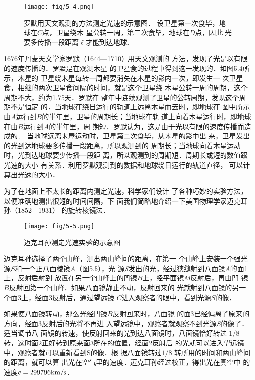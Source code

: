 \begin{figure}[htp]\centering
    \texttt{[image: fig/5-4.png]}
    \caption{罗默用天文观测的方法测定光速的示意图．
    设卫星第一次食毕，地球在$C$点，卫星绕木
    星公转一周，第二次食毕，地球在$D$点，因此
    光要多传播一段距离$\ell$才能到达地球．}
    \end{figure}

1676年丹麦天文学家罗默（1644—1710）用天文观测的
方法，发现了光是以有限的速度传播的．罗默是在观测木星
的卫星食的过程中得到这一发现的．如图5.4所示，木星的
卫星绕木星每转一周都要消失在木星的影内一次，即发生一
次卫星食，相继的两次卫星食间隔的时间，就是这个卫星绕
木星公转一周的周期，这个周期不大，约为1.75天．罗默在
整年中连续观测了卫星的公转周期，发现这个周期不是恒定
的．当地球在绕日运行的轨道上远离木星而去时，即地球在
图中所示由$A$运行到$B$的半年里，卫星的周期长；当地球在轨
道上向着木星运行时，即地球在由$B$运行到$A$的半年里，周
期短．罗默认为，这是由于光以有限的速度传播而造成的．
当地球远离木屋运动时，卫星第二次食毕，从木星的影中出
来，卫星发出的光到达地球要多传播一段距离，所以观测到的
周期长；当地球向着木星运动时，光到达地球要少传播一段距
离，所以观测到的周期短．周期长或短的数值跟光速的大小
有关系．利用罗默观测到的数据和地球绕日运行的轨道直径，
可以计算出光速的大小．

为了在地面上不太长的距离内测定光速，科学家们设计
了各种巧妙的实验方法，以便准确地测出很短的时间间隔，下
面我们简略地介绍一下美国物理学家迈克耳孙（1852—1931）
的旋转棱镜法．
\begin{figure}[htp]\centering
    \texttt{[image: fig/5-5.png]}
    \caption{迈克耳孙测定光速实验的示意图}
    \end{figure}

迈克耳孙选择了两个山峰，测出两山峰间的距离，在第一
个山峰上安装一个强光源$S$和一个正八面棱镜$A$（图5.5），光
源$S$发出的光，经过狭缝射到八面镜$A$的面1上，反射后射到
放置在另一个山峰上的凹镜$B$上，经平面镜$M$反射后，再由凹
镜$B$反射回第一个山峰．如果八面镜静止不动，反射回来的
光就射到八面镜的另一个面3上，经面3反射后，通过望远镜
$C$进入观察者的眼中，看到光源$S$的像．

如果使八面镜转动，那么光经凹镜$B$反射回来时，八面镜
的面3已经偏离了原来的方向，经面3反射后的光将不再进
入望远镜中，观察者就观察不到光源$S$的像了．适当调节八
面镜的转速，使反射回来的光到达八面镜时，八面镜恰好转过
$1/8$转，这时面2正好转到原来面3所在的位置，经面2反射后
的光就可以进入望远镜中，观察者就可以重新看到S的像．根
据八面镜转过$1/8$
转所用的时间和两山峰间的距离，就可以算
出光在空气里的速度．迈克耳孙经过校正，得出光在真空中
的速度$c=299796{\rm km}/{\rm s}$．

